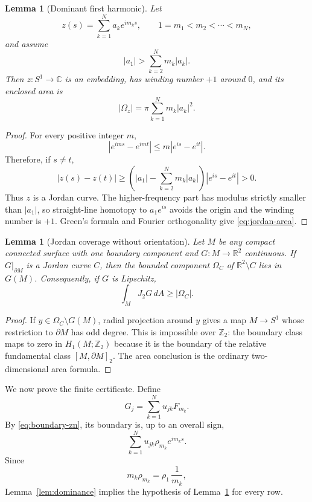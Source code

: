 \documentclass[11pt]{article}
\newtheorem{lemma}[theorem]{Lemma}
\newcommand{\C}{\mathbb C}
\newcommand{\R}{\mathbb R}
\newcommand{\Z}{\mathbb Z}
\begin{document}
\begin{lemma}[Dominant first harmonic]\label{lem:jordan}
Let
\[
        z(s)=\sum_{k=1}^Na_ke^{im_ks},
        \qquad1=m_1<m_2<\cdots<m_N,
\]
and assume
\[
        |a_1|>\sum_{k=2}^Nm_k|a_k|.
\]
Then $z:S^1\to\C$ is an embedding, has winding number $+1$ around $0$, and
its enclosed area is
\begin{equation}\label{eq:jordan-area}
        |\Omega_z|=\pi\sum_{k=1}^Nm_k|a_k|^2.
\end{equation}
\end{lemma}

\begin{proof}
For every positive integer $m$,
\[
        |e^{ims}-e^{imt}|
        \le m|e^{is}-e^{it}|.
\]
Therefore, if $s\ne t$,
\[
 |z(s)-z(t)|
 \ge
 \left(
 |a_1|-\sum_{k=2}^Nm_k|a_k|
 \right)|e^{is}-e^{it}|>0.
\]
Thus $z$ is a Jordan curve.  The higher-frequency part has modulus strictly
smaller than $|a_1|$, so straight-line homotopy to $a_1e^{is}$ avoids the
origin and the winding number is $+1$.  Green's formula and Fourier
orthogonality give \eqref{eq:jordan-area}.
\end{proof}

\begin{lemma}[Jordan coverage without orientation]\label{lem:mod2}
Let $M$ be any compact connected surface with one boundary component and
$G:M\to\R^2$ continuous.  If $G|_{\partial M}$ is a Jordan curve $C$, then
the bounded component $\Omega_C$ of $\R^2\setminus C$ lies in $G(M)$.
Consequently, if $G$ is Lipschitz,
\[
        \int_MJ_2G\,dA\ge|\Omega_C|.
\]
\end{lemma}

\begin{proof}
If $y\in\Omega_C\setminus G(M)$, radial projection around $y$ gives a map
$M\to S^1$ whose restriction to $\partial M$ has odd degree.  This is
impossible over $\Z_2$: the boundary class maps to zero in
$H_1(M;\Z_2)$ because it is the boundary of the relative fundamental class
$[M,\partial M]_2$.  The area conclusion is the ordinary two-dimensional
area formula.
\end{proof}

We now prove the finite certificate.  Define
\[
        G_j=\sum_{k=1}^Nu_{jk}F_{m_k}.
\]
By \eqref{eq:boundary-zn}, its boundary is, up to an overall sign,
\[
        \sum_{k=1}^Nu_{jk}\rho_{m_k}e^{im_ks}.
\]
Since
\[
        m_k\rho_{m_k}
        =\rho_1\,\frac1{m_k},
\]
Lemma~\ref{lem:dominance} implies the hypothesis of
Lemma~\ref{lem:jordan} for every row.
\end{document}
